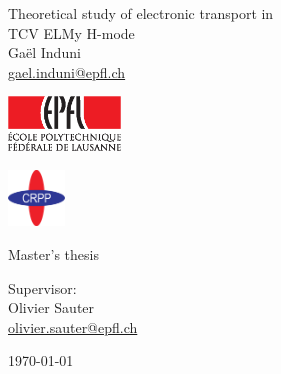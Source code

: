 \documentclass[12pt,twoside,a4paper,openright]{report}
\newcommand{\Gael}{Ga\"el Induni}
\newcommand{\thisTitleBis}{Theoretical study of electronic transport in\\[0.4cm] TCV ELMy H-mode}
\newcommand{\mail}[1]{\href{mailto:#1}{#1}}
\numberwithin{equation}{chapter}
\begin{document}
\pagestyle{empty}
\renewcommand{\thepage}{\alph{page}}
\begin{titlepage}
\begin{center}
{\Huge \thisTitleBis}\\[1.8cm]
{\Large \Gael}\\[0.7cm]
{\mail{gael.induni@epfl.ch}}\\[1.5cm]
\begin{minipage}[c]{0.52\textwidth}
\begin{flushright}
\includegraphics[width=3cm]{../pics/EPFL.eps}
\end{flushright}
\end{minipage}
\hspace{1cm}
\begin{minipage}[c]{0.4\textwidth}
\begin{flushleft}
\includegraphics[width=1.5cm]{../pics/CRPP_Logo.eps}
\end{flushleft}
\end{minipage}
\end{center}
\vspace{2cm}
\begin{center}
Master's thesis
\end{center}
\vspace{3cm}
\begin{flushright}
\large Supervisor:\\
Olivier Sauter\\
{\small \mail{olivier.sauter@epfl.ch}}
\end{flushright}
\vfill
\begin{center}
\today
\end{center}
\end{titlepage}
\cleardoublepage
\pagestyle{fancy}
\renewcommand{\thepage}{\Roman{page}}
\setcounter{page}{1}
\setlength{\parskip}{0.5ex}

\cleardoublepage
\setlength{\parskip}{0ex}
\tableofcontents
\thispagestyle{fancy}
\setlength{\parskip}{0.5ex}
\cleardoublepage
\end{document}
